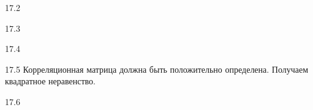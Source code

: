 \begin{solution}{{17.2}}
\end{solution}
\protect \hypertarget {soln:17.3}{}
\begin{solution}{{17.3}}
\end{solution}
\protect \hypertarget {soln:17.4}{}
\begin{solution}{{17.4}}
\end{solution}
\protect \hypertarget {soln:17.5}{}
\begin{solution}{{17.5}}
Корреляционная матрица должна быть положительно определена. Получаем квадратное неравенство.
\end{solution}
\protect \hypertarget {soln:17.6}{}
\begin{solution}{{17.6}}
\end{solution}
\protect \hypertarget {soln:17.7}{}
